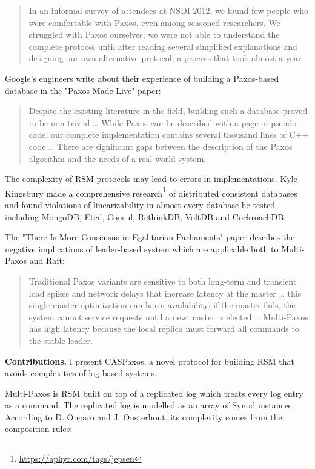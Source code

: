 \documentclass[12pt]{article}
\theoremstyle{definition}
\begin{document}
\begin{quote}
In an informal survey of attendees at NSDI 2012, we found few people who were comfortable with Paxos, even among seasoned researchers. We struggled with Paxos ourselves; we were not able to understand the complete protocol until after reading several simplified explanations and designing our own alternative protocol, a process that took almost a year
\end{quote}

Google's engineers write about their experience of building a Paxos-based database in the "Paxos Made Live"\cite{chubby} paper:

\begin{quote}
Despite the existing literature in the field, building such a database proved to be non-trivial \ldots{} While Paxos can be described with a page of pseudo-code, our complete implementation contains several thousand lines of C++ code \ldots{} There are significant gaps between the description of the Paxos algorithm and the needs of a real-world system.
\end{quote}

The complexity of RSM protocols may lead to errors in implementations. Kyle Kingsbury made a comprehensive research\footnote{\href{https://aphyr.com/tags/jepsen}{https://aphyr.com/tags/jepsen}} of distributed consistent databases and found violations of linearizability in almost every database he tested including MongoDB, Etcd, Consul, RethinkDB, VoltDB and CockroachDB.

The "There Is More Consensus in Egalitarian Parliaments" paper\cite{epaxos} descibes the negative implications of leader-based system which are applicable both to Multi-Paxos and Raft:

\begin{quote}
Traditional Paxos variants are sensitive to both long-term and transient load spikes and network delays that increase latency at the master \ldots{} this single-master optimization can harm availability: if the master fails, the system cannot service requests until a new master is elected \ldots{} Multi-Paxos has high latency because the local replica must forward all commands to the stable leader.
\end{quote}

{\bf Contributions.} I present CASPaxos, a novel protocol for building RSM that avoids complexities of log based systems.

Multi-Paxos is RSM built on top of a replicated log which treats every log entry as a command. The replicated log is modelled as an array of Synod instances. According to D. Ongaro and J. Ousterhout, its complexity comes from the composition rules:
\end{document}
